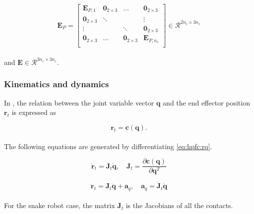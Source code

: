\begin{equation}
    \mathbf{E}_P = 
    \begin{bmatrix}
        \mathbf{E}_{P,1} & \mathbf{0}_{2\times3} & \dots & \mathbf{0}_{2\times3} \\
        \mathbf{0}_{2\times3} & \ddots & & \vdots \\
        \vdots & & \ddots & \mathbf{0}_{2\times3} \\
        \mathbf{0}_{2\times3} & \dots & \mathbf{0}_{2\times3} & \mathbf{E}_{P,n_c} \\
    \end{bmatrix} \in \mathcal{R}^{2 n_c \times 3 n_c}
\end{equation}
\\
and $\mathbf{E} \in \mathcal{R}^{3 n_c \times 3 n_c}$.


\subsubsection{Kinematics and dynamics}

In \cite{yoshikawa1987dynamic}, the relation between the joint variable vector $\mathbf{q}$ and the end effector position $\mathbf{r}_t$ is expressed as

\begin{equation}\label{eq:hpfc:rq}
    \mathbf{r}_t = \mathbf{c(q)}.
\end{equation}
\\
The following equations are generated by differentiating \ref{eq:hpfc:rq}.

\begin{equation}
    \mathbf{\dot{r}}_t = \mathbf{J}_t \mathbf{\dot{q}}, \quad \mathbf{J}_t = \frac{\partial \mathbf{c(q)}}{\partial \mathbf{q}^T}
\end{equation}

\begin{equation}\label{eq:dhpfc_aq}
    \mathbf{\ddot{r}}_t = \mathbf{J}_t \mathbf{\ddot{q}} + \mathbf{a}_q, \quad \mathbf{a}_q = \mathbf{\dot{J}}_t \mathbf{\dot{q}}   
\end{equation}
\\
For the snake robot case, the matrix $\mathbf{J}_t$ is the Jacobians of all the contacts.

